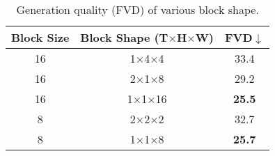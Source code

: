\begin{table}[htbp]
\centering
\caption{Generation quality (FVD) of various block shape.}
\label{tab:block_shape}
\begin{tabular}{ccc}
\toprule
Block Size & Block Shape (T$\times$H$\times$W) & FVD$\downarrow$ \\
\midrule
16 & 1$\times$4$\times$4 & 33.4 \\
16 & 2$\times$1$\times$8 & 29.2 \\ 
16 & 1$\times$1$\times$16 & \textbf{25.5} \\\midrule
8  & 2$\times$2$\times$2  & 32.7 \\
8  & 1$\times$1$\times$8  & \textbf{25.7} \\
\bottomrule
\end{tabular}
\end{table}